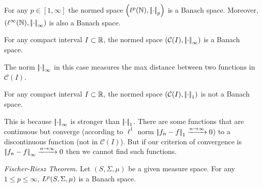 \documentclass{article}
\begin{document}
\begin{proposition}
	For any $p\in[1,\infty]$ the normed space $\left(\ell^{p}(\mathbb{N}),\left|\negthinspace\left|\cdot\right|\negthinspace\right|_{p}\right)$ is a Banach space. Moreover, $\left(\ell^{\infty}(\mathbb{N}),\left|\negthinspace\left|\cdot\right|\negthinspace\right|_{\infty}\right)$ is also a Banach space.
\end{proposition}
\begin{proposition}
	For any compact interval $I\subset\mathbb{R}$, the normed space $\left(\mathcal{C}(I),\left|\negthinspace\left|\cdot\right|\negthinspace\right|_{\infty}\right)$ is a Banach space.
\end{proposition}
The norm $\left|\negthinspace\left|\cdot\right|\negthinspace\right|_{\infty}$ in this case measures the max distance between two functions in $\mathcal{C}(I)$.
\begin{proposition}
	For any compact interval $I\subset\mathbb{R}$, the normed space $\left(\mathcal{C}(I),\left|\negthinspace\left|\cdot\right|\negthinspace\right|_{1}\right)$ is not a Banach space.
\end{proposition}
This is because $\left|\negthinspace\left|\cdot\right|\negthinspace\right|_{\infty}$ is stronger than $\left|\negthinspace\left|\cdot\right|\negthinspace\right|_{1}$. There are some functions that are continuous but converge (according to $\ell^{1}$ norm $\left|\negthinspace\left|f_{n}-f\right|\negthinspace\right|_{1}\xrightarrow{n\to\infty}0$) to a discontinuous function (not in $\mathcal{C}(I)$). But if our criterion of convergence is $\left|\negthinspace\left|f_{n}-f\right|\negthinspace\right|_{\infty}\xrightarrow{n\to\infty}0$ then we cannot find such functions.
\begin{theorem}
	\emph{Fischer-Riesz Theorem.} Let $(S,\Sigma,\mu)$ be a given measure space. For any $1\leq p\leq\infty$, $L^{p}(S,\Sigma,\mu)$ is a Banach space.
\end{theorem}
\end{document}

